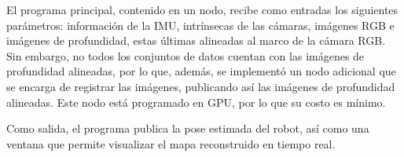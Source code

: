 El programa principal, contenido en un nodo, recibe como entradas los siguientes parámetros: información de la IMU, intrínsecas de las cámaras, imágenes RGB e imágenes de profundidad, estas últimas alineadas al marco de la cámara RGB. Sin embargo, no todos los conjuntos de datos cuentan con las imágenes de profundidad alineadas, por lo que, además, se implementó un nodo adicional que se encarga de registrar las imágenes, publicando así las imágenes de profundidad alineadas. Este nodo está programado en GPU, por lo que su costo es mínimo.

Como salida, el programa publica la pose estimada del robot, así como una ventana que permite visualizar el mapa reconstruido en tiempo real.





